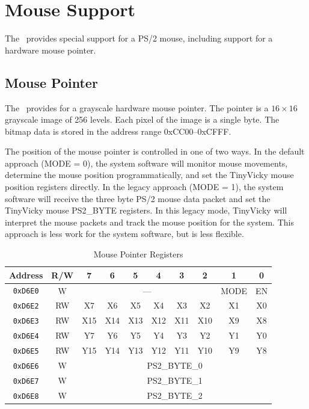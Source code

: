 \section*{Mouse Support}

The \jr\ provides special support for a PS/2 mouse, including support for a hardware mouse pointer.

\subsection*{Mouse Pointer}

The \jr\ provides for a grayscale hardware mouse pointer. The pointer is a $16 \times 16$ grayscale image of 256 levels. Each pixel of the image is a single byte. The bitmap data is stored in the address range 0xCC00--0xCFFF.

The position of the mouse pointer is controlled in one of two ways. In the default approach (MODE = 0), the system software will monitor mouse movements, determine the mouse position programmatically, and set the TinyVicky mouse position registers directly. In the legacy approach (MODE = 1), the system software will receive the three byte PS/2 mouse data packet and set the TinyVicky mouse PS2\_BYTE registers. In this legacy mode, TinyVicky will interpret the mouse packets and track the mouse position for the system. This approach is less work for the system software, but is less flexible.

\begin{table}[ht]
    \begin{center}
        \begin{tabular}{|c|c|c|c|c|c|c|c|c|c|} \hline
            Address & R/W & 7 & 6 & 5 & 4 & 3 & 2 & 1 & 0 \\\hline\hline
            \verb+0xD6E0+ & W & \multicolumn{6}{|c|}{---} & MODE & EN \\\hline
            \verb+0xD6E2+ & RW & X7 & X6 & X5 & X4 & X3 & X2 & X1 & X0 \\\hline
            \verb+0xD6E3+ & RW & X15 & X14 & X13 & X12 & X11 & X10 & X9 & X8 \\\hline
            \verb+0xD6E4+ & RW & Y7 & Y6 & Y5 & Y4 & Y3 & Y2 & Y1 & Y0 \\\hline
            \verb+0xD6E5+ & RW & Y15 & Y14 & Y13 & Y12 & Y11 & Y10 & Y9 & Y8 \\\hline
            \verb+0xD6E6+ & W & \multicolumn{8}{|c|}{PS2\_BYTE\_0} \\\hline
            \verb+0xD6E7+ & W & \multicolumn{8}{|c|}{PS2\_BYTE\_1} \\\hline
            \verb+0xD6E8+ & W & \multicolumn{8}{|c|}{PS2\_BYTE\_2} \\\hline
        \end{tabular}
    \end{center}
    \caption{Mouse Pointer Registers}
    \label{tab:mouse_reg}
\end{table}

